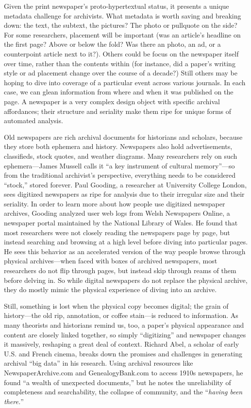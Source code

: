 Given the print newspaper's proto-hypertextual status, it presents a unique metadata challenge for archivists. What metadata is worth saving and breaking down: the text, the subtext, the pictures? The photo or pullquote on the side? For some researchers, placement will be important (was an article's headline on the first page? Above or below the fold? Was there an photo, an ad, or a counterpoint article next to it?). Others could be focus on the newspaper itself over time, rather than the contents within (for instance, did a paper's writing style or ad placement change over the course of a decade?) Still others may be hoping to dive into coverage of a particular event across various journals. In each case, we can glean information from where and when it was published on the page. A newspaper is a very complex design object with specific archival affordances; their structure and seriality make them ripe for unique forms of automated analysis.

Old newspapers are rich archival documents for historians and scholars, because they store both ephemera and history. Newspapers also hold advertisements, classifieds, stock quotes, and weather diagrams. Many researchers rely on such ephemera---James Mussell calls it ``a key instrument of cultural memory''---so from the traditional archivist's perspective, everything needs to be considered ``stock,'' stored forever.\autocite{mussell_passing_2012} Paul Gooding, a researcher at University College London, sees digitized newspapers as ripe for analysis due to their irregular size and their seriality.\autocite{gooding_exploring_2014} In order to learn more about how people use digitized newspaper archives, Gooding analyzed user web logs from Welsh Newspapers Online, a newspaper portal maintained by the National Library of Wales. He found that most researchers were not closely reading the newspapers page by page, but instead searching and browsing at a high level before diving into particular pages. He sees this behavior as an accelerated version of the way people browse through physical archives---when faced with boxes of archived newspapers, most researchers do not flip through pages, but instead skip through reams of them before delving in. So while digital newspapers do not replace the physical archive, they do mostly mimic the physical experience of diving into an archive.

Still, something is lost when the physical copy becomes digital; the grain of history---the old rip, annotation, or coffee stain---is reduced to information.  As many theorists and historians remind us, too, a paper's physical appearance and content are closely linked together, so simply ``digitizing'' and newspaper changes it massively, reshaping a great deal of context.\autocites[See, e.g.,][388-389]{manoff_archive_2010}{mussell_elemental_2014} Richard Abel, a scholar of early U.S. and French cinema, breaks down the promises and challenges in generating archival ``big data'' in his research. Using archival resources like NewspaperArchive.com and GenealogyBank.com to access 1910s newspapers, he found ``a wealth of unexpected documents,'' but he notes the unreliability of completeness and searchability, the collapse of community, and the ``\emph{having been there.}''\autocite[6]{abel_pleasures_2013}

